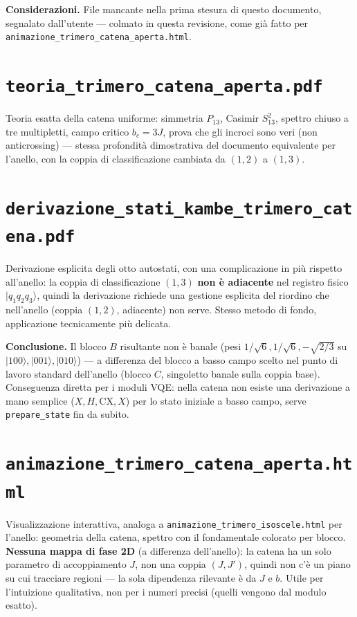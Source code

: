 \documentclass[11pt,a4paper]{article}
\begin{document}
\textbf{Considerazioni.} File mancante nella prima stesura di questo documento,
segnalato dall'utente — colmato in questa revisione, come già fatto per
\texttt{animazione\_trimero\_catena\_aperta.html}.

\section*{\texttt{teoria\_trimero\_catena\_aperta.pdf}}

Teoria esatta della catena uniforme: simmetria $P_{13}$, Casimir $S_{13}^2$, spettro
chiuso a tre multipletti, campo critico $b_c=3J$, prova che gli incroci sono veri (non
anticrossing) — stessa profondità dimostrativa del documento equivalente per l'anello,
con la coppia di classificazione cambiata da $(1,2)$ a $(1,3)$.

\section*{\texttt{derivazione\_stati\_kambe\_trimero\_catena.pdf}}

Derivazione esplicita degli otto autostati, con una complicazione in più rispetto
all'anello: la coppia di classificazione $(1,3)$ \textbf{non è adiacente} nel registro
fisico $|q_1q_2q_3\rangle$, quindi la derivazione richiede una gestione esplicita del
riordino che nell'anello (coppia $(1,2)$, adiacente) non serve. Stesso metodo di fondo,
applicazione tecnicamente più delicata.

\textbf{Conclusione.} Il blocco $B$ risultante non è banale (pesi
$1/\sqrt6,1/\sqrt6,-\sqrt{2/3}$ su $|100\rangle,|001\rangle,|010\rangle$) — a
differenza del blocco a basso campo scelto nel punto di lavoro standard dell'anello
(blocco $C$, singoletto banale sulla coppia base). Conseguenza diretta per i moduli
VQE: nella catena non esiste una derivazione a mano semplice ($X,H,\mathrm{CX},X$) per
lo stato iniziale a basso campo, serve \texttt{prepare\_state} fin da subito.

\section*{\texttt{animazione\_trimero\_catena\_aperta.html}}

Visualizzazione interattiva, analoga a \texttt{animazione\_trimero\_isoscele.html}
per l'anello: geometria della catena, spettro con il fondamentale colorato per
blocco. \textbf{Nessuna mappa di fase 2D} (a differenza dell'anello): la catena ha un
solo parametro di accoppiamento $J$, non una coppia $(J,J')$, quindi non c'è un piano
su cui tracciare regioni — la sola dipendenza rilevante è da $J$ e $b$. Utile per
l'intuizione qualitativa, non per i numeri precisi (quelli vengono dal modulo esatto).
\end{document}
